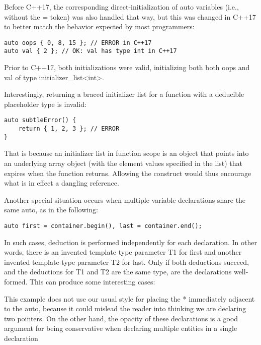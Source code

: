 Before C++17, the corresponding direct-initialization of auto variables (i.e., without the = token) was also handled that way, but this was changed in C++17 to better match the behavior expected by most programmers:

\begin{lstlisting}[style=styleCXX]
auto oops { 0, 8, 15 }; // ERROR in C++17
auto val { 2 }; // OK: val has type int in C++17
\end{lstlisting}

Prior to C++17, both initializations were valid, initializing both both oops and val of type initializer\_list<int>.

Interestingly, returning a braced initializer list for a function with a deducible placeholder type is invalid:

\begin{lstlisting}[style=styleCXX]
auto subtleError() {
	return { 1, 2, 3 }; // ERROR
}
\end{lstlisting}

That is because an initializer list in function scope is an object that points into an underlying array object (with the element values specified in the list) that expires when the function returns. Allowing the construct would thus encourage what is in effect a dangling reference.

Another special situation occurs when multiple variable declarations share the same auto, as in the following:

\begin{lstlisting}[style=styleCXX]
auto first = container.begin(), last = container.end();
\end{lstlisting}

In such cases, deduction is performed independently for each declaration. In other words, there is an invented template type parameter T1 for first and another invented template type parameter T2 for last. Only if both deductions succeed, and the deductions for T1 and T2 are the same type, are the declarations well-formed. This can produce some interesting cases:

\begin{tcolorbox}[colback=webgreen!5!white,colframe=webgreen!75!black]
\hspace*{0.75cm}This example does not use our usual style for placing the * immediately adjacent to the auto, because it could mislead the reader into thinking we are declaring two pointers. On the other hand, the opacity of these declarations is a good argument for being conservative when declaring multiple entities in a single declaration
\end{tcolorbox}

